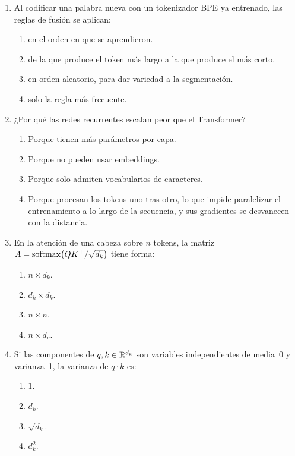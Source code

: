 \begin{enumerate}[label=\textbf{A.\arabic*.},ref=A.\arabic*,leftmargin=2.6em,itemsep=8pt]
\item\label{q:orden} Al codificar una palabra nueva con un tokenizador BPE ya entrenado, las reglas de fusión se aplican: \punto
\begin{enumerate}[label=(\alph*)]
  \item en el orden en que se aprendieron.
  \item de la que produce el token más largo a la que produce el más corto.
  \item en orden aleatorio, para dar variedad a la segmentación.
  \item solo la regla más frecuente.
\end{enumerate}

\item\label{q:rnn} ¿Por qué las redes recurrentes escalan peor que el Transformer? \punto
\begin{enumerate}[label=(\alph*)]
  \item Porque tienen más parámetros por capa.
  \item Porque no pueden usar embeddings.
  \item Porque solo admiten vocabularios de caracteres.
  \item Porque procesan los tokens uno tras otro, lo que impide paralelizar el entrenamiento a lo largo de la secuencia, y sus gradientes se desvanecen con la distancia.
\end{enumerate}

\item\label{q:forma} En la atención de una cabeza sobre $n$ tokens, la matriz $A=\operatorname{softmax}\bigl(QK^{\top}/\sqrt{d_k}\bigr)$ tiene forma: \punto
\begin{enumerate}[label=(\alph*)]
  \item $n\times d_k$.
  \item $d_k\times d_k$.
  \item $n\times n$.
  \item $n\times d_v$.
\end{enumerate}

\item\label{q:varianza} Si las componentes de $q,k\in\mathbb{R}^{d_k}$ son variables independientes de media~0 y varianza~1, la varianza de $q\cdot k$ es: \punto
\begin{enumerate}[label=(\alph*)]
  \item $1$.
  \item $d_k$.
  \item $\sqrt{d_k}$.
  \item $d_k^{2}$.
\end{enumerate}


\end{enumerate}
